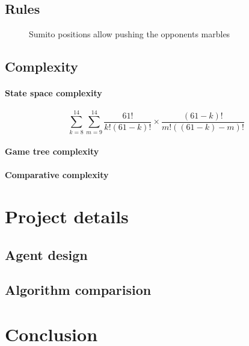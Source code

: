 \documentclass{llncs}
\begin{document}
\subsection{Rules}

\begin{figure}[!h]
  \centering
  \hfill
  \hfill
  \caption{Sumito positions allow pushing the opponents marbles \cite{abalone_sa_abalone_nodate}}
\end{figure}

\subsection{Complexity}

\paragraph{State space complexity}

$$
  \sum_{k=8}^{14}\sum_{m=9}^{14}\frac{61!}{k!(61-k)!}\times\frac{(61-k)!}{m!((61-k)-m)!}
$$

\paragraph{Game tree complexity}

\paragraph{Comparative complexity}

\section{Project details}

\subsection{Agent design}

\subsection{Algorithm comparision}

\subsection{}

\section{Conclusion}



\end{document}
